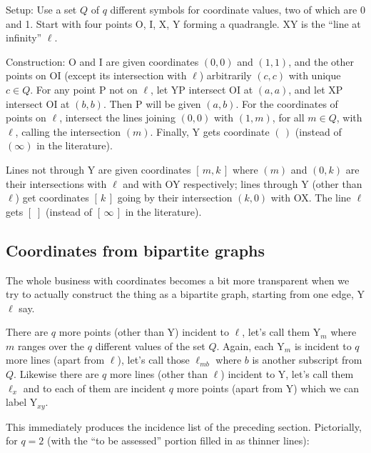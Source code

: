 \documentclass[12pt]{article}
\begin{document}
Setup: Use a set $Q$ of $q$ different symbols for coordinate values, two of which are 0 and 1.  Start with four {\sc point}s O, I, X, Y forming a quadrangle.  XY is the ``{\sc line} at infinity'' $\ell$.

Construction: O and I are given coordinates $(0,0)$ and $(1,1)$, and the other {\sc point}s on OI (except its intersection with $\ell$) arbitrarily $(c,c)$ with unique $c\in Q$.  For any {\sc point} P not on $\ell$, let YP
intersect OI at $(a,a)$, and let XP intersect OI at $(b,b)$.  Then P will be given $(a,b)$.  For the coordinates of {\sc point}s on $\ell$, intersect the {\sc line}s joining $(0,0)$ with $(1,m)$, for all $m \in Q$, with $\ell$, calling the intersection $(m)$.  Finally, Y gets coordinate $(\,)$ (instead of $(\infty)$ in the literature).

{\sc Lines} not through Y are given coordinates $[\,m,k\,]$ where $(m)$ and $(0,k)$ are their intersections with $\ell$ and with OY respectively; {\sc line}s through Y (other than $\ell$) get coordinates $[\,k\,]$ going by their
intersection $(k,0)$ with OX.  The {\sc line} $\ell$ gets $[\;]$ (instead of $[\,\infty\,]$ in the literature).

\clearpage
\subsection*{Coordinates from bipartite graphs}

The whole business with coordinates becomes a bit more transparent when we try
to actually construct the thing as a bipartite graph, starting from one edge,
Y$\ell$ say.

There are $q$ more {\sc point}s (other than Y) incident to $\ell$, let's call
them Y$_m$ where $m$ ranges over the $q$ different values of the set $Q$.
Again, each Y$_m$ is incident to $q$ more {\sc line}s (apart from $\ell$), let's
call those $\ell_{mb}$ where $b$ is another subscript from $Q$.
Likewise there are $q$ more {\sc line}s (other than $\ell$) incident to Y, let's
call them $\ell_x$ and to each of them are incident $q$ more {\sc point}s (apart
from Y) which we can label Y$_{xy}$.

This immediately produces the incidence list of the preceding section.
Pictorially, for $q=2$ (with the ``to be assessed'' portion filled in
as thinner lines):
\end{document}
